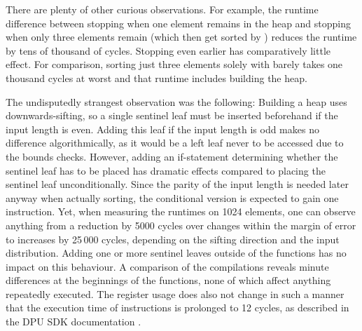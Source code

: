 There are plenty of other curious observations.
For example, the runtime difference between stopping \HS{} when one element remains in the heap and stopping \HS{} when only three elements remain (which then get sorted by \IS{}) reduces the runtime by tens of thousand of cycles.
Stopping \HS{} even earlier has comparatively little effect.
For comparison, sorting just three elements solely with \HS{} barely takes one thousand cycles at worst and that runtime includes building the heap.

The undisputedly strangest observation was the following:
Building a heap uses downwards-sifting, so a single sentinel leaf must be inserted beforehand if the input length is even.
Adding this leaf if the input length is odd makes no difference algorithmically, as it would be a left leaf never to be accessed due to the bounds checks.
However, adding an if-statement determining whether the sentinel leaf has to be placed has dramatic effects compared to placing the sentinel leaf unconditionally.
Since the parity of the input length is needed later anyway when actually sorting, the conditional version is expected to gain one instruction.
Yet, when measuring the runtimes on 1024 elements, one can observe anything from a reduction by 5000 cycles over changes within the margin of error to increases by 25\,000 cycles, depending on the sifting direction and the input distribution.
Adding one or more sentinel leaves outside of the \HS{} functions has no impact on this behaviour.
A comparison of the compilations reveals minute differences at the beginnings of the \HS{} functions, none of which affect anything repeatedly executed.
The register usage does also not change in such a manner that the execution time of instructions is prolonged to 12 cycles, as described in the DPU SDK documentation \cite[Instruction Set Architecture -- Efficient scheduling]{upmemSDK}.
